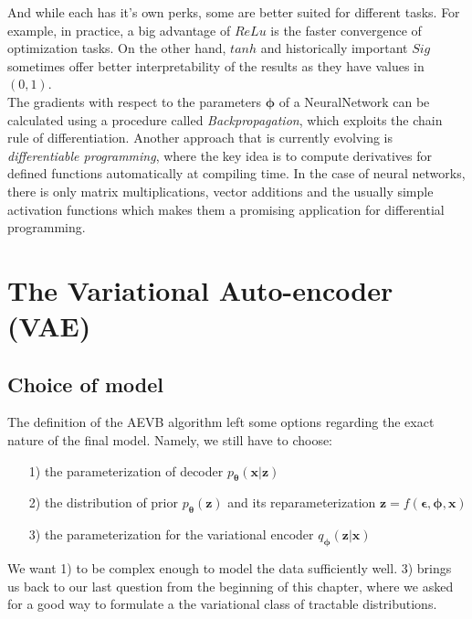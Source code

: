 \documentclass[12pt]{report}
\theoremstyle{definition}
\begin{document}
And while each has it's own perks, some are better suited for different tasks. For example, in practice, a big advantage of $ReLu$ is the faster convergence of optimization tasks. On the other hand, $tanh$ and historically important $Sig$ sometimes offer better interpretability of the results as they have values in $(0, 1)$. \\
The gradients with respect to the parameters $\pmb{\phi}$ of a NeuralNetwork can be calculated using a procedure called \emph{Backpropagation}, which exploits the chain rule of differentiation. Another approach that is currently evolving is \emph{differentiable programming}, where the key idea is to compute derivatives for defined functions automatically at compiling time. In the case of neural networks, there is only matrix multiplications, vector additions and the usually simple activation functions which makes them a promising application for differential programming.

\section{The Variational Auto-encoder (VAE)}
\subsection{Choice of model}

The definition of the AEVB algorithm left some options regarding the exact nature of the final model. Namely, we still have to choose:
\begin{itemize}
\item[1)] the parameterization of decoder $p_{\pmb{\theta}}(\mathbf{x}|\mathbf{z})$
\item[2)] the distribution of prior $p_{\pmb{\theta}}(\mathbf{z})$ and its reparameterization $\mathbf{z} = f(\pmb{\epsilon}, \pmb{\phi}, \mathbf{x})$
\item[3)] the parameterization for the variational encoder $q_{\pmb{\phi}}(\mathbf{z}|\mathbf{x})$
\end{itemize}
We want 1) to be complex enough to model the data sufficiently well. 3) brings us back to our last question from the beginning of this chapter, where we asked for a good way to formulate a the variational class of tractable distributions. 
 
\end{document}
